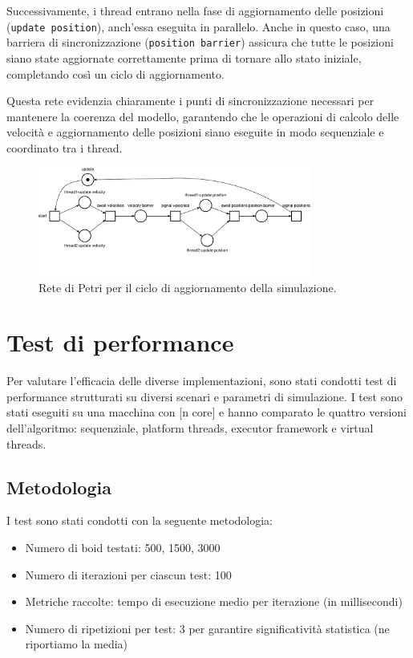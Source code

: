 \documentclass[a4paper,12pt]{report}
\begin{document}
Successivamente, i thread entrano nella fase di aggiornamento delle posizioni (\texttt{update position}), anch'essa eseguita in parallelo. Anche in questo caso, una barriera di sincronizzazione (\texttt{position barrier}) assicura che tutte le posizioni siano state aggiornate correttamente prima di tornare allo stato iniziale, completando così un ciclo di aggiornamento.

Questa rete evidenzia chiaramente i punti di sincronizzazione necessari per mantenere la coerenza del modello, garantendo che le operazioni di calcolo delle velocità e aggiornamento delle posizioni siano eseguite in modo sequenziale e coordinato tra i thread.

\begin{figure}[h!]
    \centering
    \includegraphics[width=0.8\textwidth]{rete_update_cycle.pdf}
    \caption{Rete di Petri per il ciclo di aggiornamento della simulazione.}
    \label{fig:rete_update_cycle}
\end{figure}

\chapter{Test di performance}
Per valutare l'efficacia delle diverse implementazioni, sono stati condotti test di performance strutturati su diversi scenari e parametri di simulazione. I test sono stati eseguiti su una macchina con [n core] e hanno comparato le quattro versioni dell'algoritmo: sequenziale, platform threads, executor framework e virtual threads.

\section{Metodologia}
I test sono stati condotti con la seguente metodologia:
\begin{itemize}
    \item Numero di boid testati: 500, 1500, 3000
    \item Numero di iterazioni per ciascun test: 100
    \item Metriche raccolte: tempo di esecuzione medio per iterazione (in millisecondi) 
    \item Numero di ripetizioni per test: 3 per garantire significatività statistica (ne riportiamo la media)
\end{itemize}
\end{document}
